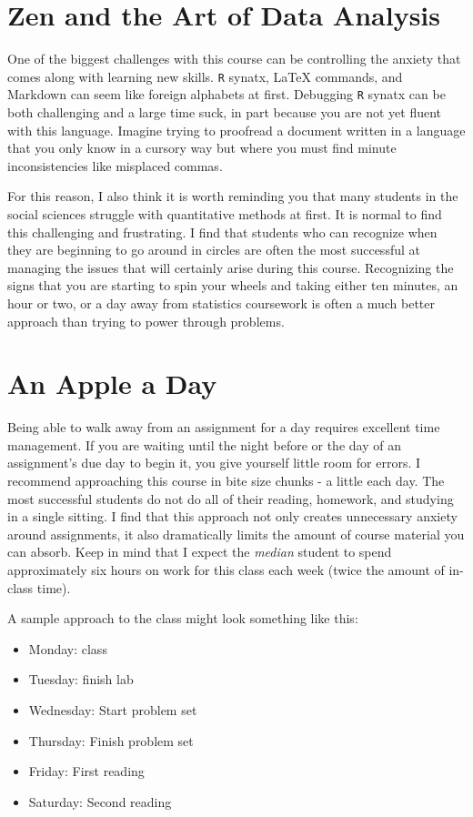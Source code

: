 \documentclass[]{book}
\providecommand{\tightlist}{%
  \setlength{\itemsep}{0pt}\setlength{\parskip}{0pt}}
\theoremstyle{definition}
\theoremstyle{definition}
\theoremstyle{remark}
\begin{document}
\section{Zen and the Art of Data
Analysis}\label{zen-and-the-art-of-data-analysis}

One of the biggest challenges with this course can be controlling the
anxiety that comes along with learning new skills. \texttt{R} synatx,
LaTeX commands, and Markdown can seem like foreign alphabets at first.
Debugging \texttt{R} synatx can be both challenging and a large time
suck, in part because you are not yet fluent with this language. Imagine
trying to proofread a document written in a language that you only know
in a cursory way but where you must find minute inconsistencies like
misplaced commas.

For this reason, I also think it is worth reminding you that many
students in the social sciences struggle with quantitative methods at
first. It is normal to find this challenging and frustrating. I find
that students who can recognize when they are beginning to go around in
circles are often the most successful at managing the issues that will
certainly arise during this course. Recognizing the signs that you are
starting to spin your wheels and taking either ten minutes, an hour or
two, or a day away from statistics coursework is often a much better
approach than trying to power through problems.

\section{An Apple a Day}\label{an-apple-a-day}

Being able to walk away from an assignment for a day requires excellent
time management. If you are waiting until the night before or the day of
an assignment's due day to begin it, you give yourself little room for
errors. I recommend approaching this course in bite size chunks - a
little each day. The most successful students do not do all of their
reading, homework, and studying in a single sitting. I find that this
approach not only creates unnecessary anxiety around assignments, it
also dramatically limits the amount of course material you can absorb.
Keep in mind that I expect the \emph{median} student to spend
approximately six hours on work for this class each week (twice the
amount of in-class time).

A sample approach to the class might look something like this:

\begin{itemize}
\tightlist
\item
  Monday: class
\item
  Tuesday: finish lab
\item
  Wednesday: Start problem set
\item
  Thursday: Finish problem set
\item
  Friday: First reading
\item
  Saturday: Second reading
\end{itemize}
\end{document}
